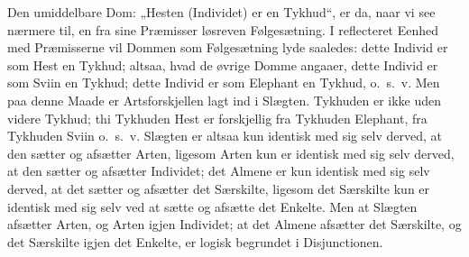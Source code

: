 \documentclass[12pt]{book}
\begin{document}
Den umiddelbare Dom: „Hesten (Individet) er en Tykhud“, er da, naar vi see nærmere til, en fra sine Præmisser løsreven Følgesætning. I reflecteret Eenhed med Præmisserne vil Dommen som Følgesætning lyde saaledes: dette Individ er som Hest en Tykhud; altsaa, hvad de øvrige Domme angaaer, dette Individ er som Sviin en Tykhud; dette Individ er som Elephant en Tykhud, o.\ s.\ v. Men paa denne Maade er Artsforskjellen lagt ind i Slægten. Tykhuden er ikke uden videre Tykhud; thi Tykhuden Hest er forskjellig fra Tykhuden Elephant, fra Tykhuden Sviin o.\ s.\ v. Slægten er altsaa kun identisk med sig selv derved, at den sætter og afsætter Arten, ligesom Arten kun er identisk med sig selv derved, at den sætter og afsætter Individet; det Almene er kun identisk med sig selv derved, at det sætter og afsætter det Særskilte, ligesom det Særskilte kun er identisk med sig selv ved at sætte og afsætte det Enkelte. Men at Slægten afsætter Arten, og Arten igjen Individet; at det Almene afsætter det Særskilte, og det Særskilte igjen det Enkelte, er logisk begrundet i Disjunctionen.
\end{document}
